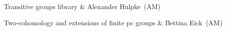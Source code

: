 Transitive groups library &
Alexander Hulpke~(AM)

Two-cohomology and extensions of finite pc groups &
Bettina Eick~(AM)

\enditems

\hfuzz=0.1pt%


